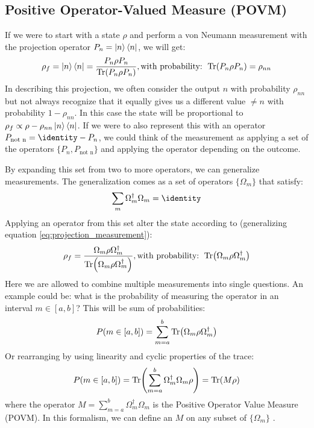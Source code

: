 \subsection{Positive Operator-Valued Measure (POVM)}
If we were to start with a state $\rho$ and perform a von Neumann measurement with the projection operator $P_n = \ket{n}\bra{n}$, we will get:
\begin{equation}\label{eq:projection_measurement}
    \rho_f = \ket{n}\bra{n}= \frac{P_n \rho P_n}{\Tr(P_n \rho P_n)}, \text{with probability: } \Tr(P_n \rho P_n) = \rho_{nn}
\end{equation}
In describing this projection, we often consider the output $n$ with probability $\rho_{nn}$ but not always recognize that it equally gives us a different value $\neq n$ with probability $1 - \rho_{nn}$. In this case the state will be proportional to $\rho_f \propto \rho - \rho_{nn}\ket{n}\bra{n}$. If we were to also represent this with an operator $P_{\text{not n}} = \identity - P_n$, we could think of the measurement as applying  a set of the operators $\{P_n, P_{\text{not n}}\}$ and applying the operator depending on the outcome.

By expanding this set from two to more operators, we can generalize measurements. The generalization comes as a set of operators $\{\Omega_m\}$ that satisfy:
\begin{equation}\label{eq:sum_requirement_POVM}
    \sum_m \Omega_m^\dagger \Omega_m = \identity
\end{equation}
Applying an operator from this set alter the state according to (generalizing equation \ref{eq:projection_measurement}):
\begin{equation}\label{eq:POVM_collapse}
        \rho_f = \frac{\Omega_m \rho  \Omega_m^\dagger}{\Tr(\Omega_m \rho \Omega_m^\dagger)}, \text{with probability: } \Tr(\Omega_m \rho \Omega_m^\dagger)
\end{equation}
Here we are allowed to combine multiple measurements into single questions. An example could be: what is the probability of measuring the operator in an interval $m\in[a, b]$? This will be sum of probabilities: 
\begin{equation}
    P(m \in [a, b]) = \sum_{m = a}^b \Tr(\Omega_m\rho\Omega_m^\dagger)
\end{equation}
Or rearranging by using linearity and cyclic properties of the trace:
\begin{equation}
    P(m \in [a, b]) = \Tr( \sum_{m = a}^b \Omega_m^\dagger \Omega_m\rho) = \Tr(M \rho)
\end{equation}
where the operator $M = \sum_{m = a}^b \Omega_m^\dagger \Omega_m$ is the Positive Operator Value Measure (POVM). In this formalism, we can define an $M$ on any subset of $\{\Omega_m\}$ \cite{jacobs_straightforward_2006}. 

